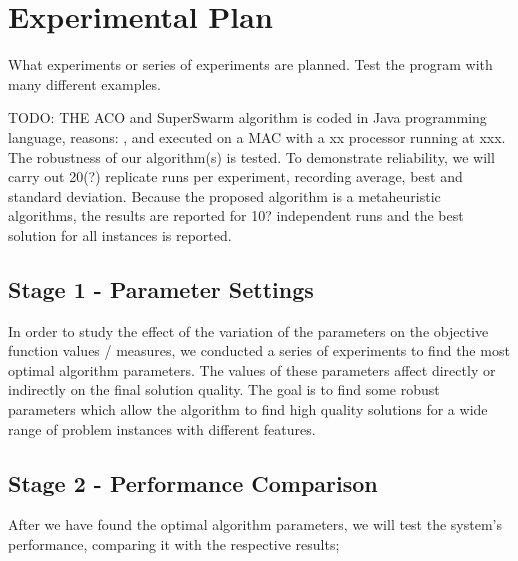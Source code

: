\section{Experimental Plan}

What experiments or series of experiments are planned. Test the program with many different examples.

TODO: THE ACO and SuperSwarm algorithm is coded in Java programming language, reasons: , and executed on a MAC with a xx processor running at xxx.
The robustness of our algorithm(s) is tested. To demonstrate reliability, we will carry out 20(?) replicate runs per experiment, recording average, best and standard deviation. Because the proposed algorithm is a metaheuristic algorithms, the results are reported for 10? independent runs and the best solution for all instances is reported. 

\subsection{Stage 1 - Parameter Settings}

In order to study the effect of the variation of the parameters on the objective function values / measures, we conducted a series of experiments to find the most optimal algorithm parameters. The values of these parameters affect directly or indirectly on the final solution quality. The goal is to find some robust parameters which allow the algorithm to find high quality solutions for a wide range of problem instances with different features. 

\subsection{Stage 2 - Performance Comparison}

After we have found the optimal algorithm parameters, we will test the system's performance, comparing it with the respective results;

